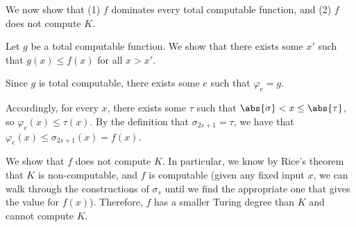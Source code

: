 \begin{problem}
\begin{answer}
    We now show that (1) $f$ dominates every total computable function,
    and (2) $f$ does not compute $K$.
    \begin{enumarabic}
      \item Let $g$ be a total computable function.
        We show that there exists some $x'$ such that $g(x) \leq f(x)$
        for all $x > x'$.
        \begin{enumalph}
          \item Since $g$ is total computable, there exists some $e$
            such that $\varphi_e = g$.
          \item Accordingly, for every $x$, there exists some $\tau$ such that
            $\abs{\sigma} < x \leq \abs{\tau}$, so $\varphi_e(x) \leq \tau(x)$.
            By the definition that $\sigma_{2s + 1} = \tau$,
            we have that $\varphi_e(x) \leq \sigma_{2s + 1}(x) = f(x)$.
        \end{enumalph}
      \item We show that $f$ does not compute $K$. \newline
        In particular, we know by Rice's theorem that $K$ is non-computable,
        and $f$ is computable (given any fixed input $x$, we can walk through
        the constructions of $\sigma_s$ until we find the appropriate one that
        gives the value for $f(x)$).
        Therefore, $f$ has a smaller Turing degree than $K$
        and cannot compute $K$.
    \end{enumarabic}
  \end{answer}
\end{problem}
